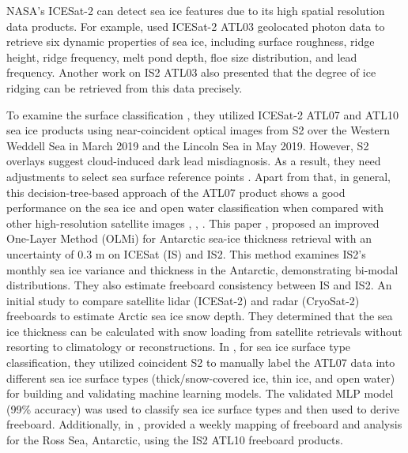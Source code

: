 

NASA's 
ICESat-2 can detect sea ice features due to its high spatial resolution data products. For example, \cite{farrell2020mapping} used ICESat-2 ATL03 geolocated photon data to retrieve six dynamic properties of sea ice, including surface roughness, ridge height, ridge frequency, melt pond depth, floe size distribution, and lead frequency.
Another work on IS2 ATL03 \cite{fredensborg2020estimation} also presented that the degree of ice ridging can be retrieved from this data precisely. 



To examine the surface classification \cite{petty2021assessment}, they utilized ICESat-2 ATL07 and ATL10 sea ice products using near-coincident optical images from S2 over the Western Weddell Sea in March 2019 and the Lincoln Sea in May 2019. However, S2 overlays suggest cloud-induced dark lead misdiagnosis. As a result, they need adjustments to select sea surface reference points \cite{kwok2021refining}. 
Apart from that, in general, this decision-tree-based approach of the ATL07 product shows a good performance on the sea ice and open water classification when compared with other high-resolution satellite images \cite{kwok2019surface}, \cite{kwok2021refining}, \cite{petty2021assessment}.
%
This paper \cite{xu2021deriving}, proposed an improved One-Layer Method (OLMi) for Antarctic sea-ice thickness retrieval with an uncertainty of 0.3 m on ICESat (IS) and IS2. This method examines IS2's monthly sea ice variance and thickness in the Antarctic, demonstrating bi-modal distributions. They also estimate freeboard consistency between IS and IS2.
%
An initial study \cite{kwok2020arctic} to compare satellite lidar (ICESat-2) and radar (CryoSat-2) freeboards to estimate Arctic sea ice snow depth. They determined that the sea ice thickness can be calculated with snow loading from satellite retrievals without resorting to climatology or reconstructions.
%
In \cite{koo2023sea}, for sea ice surface type classification, they utilized coincident S2 to manually label the ATL07 data into different sea ice surface types (thick/snow-covered ice, thin ice, and open water) for building and validating machine learning models. The validated MLP model (99\% accuracy) was used to classify sea ice surface types and then used to derive freeboard. Additionally, in \cite{koo2021weekly}, provided a weekly mapping of freeboard and analysis for the Ross Sea, Antarctic, using the IS2 ATL10 freeboard products.


